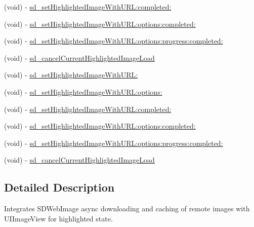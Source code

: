 \begin{DoxyCompactItemize}
\item 
(void) -\/ \mbox{\hyperlink{category_u_i_image_view_07_highlighted_web_cache_08_a25316746c184695632dd8f4b36fd219c}{sd\+\_\+set\+Highlighted\+Image\+With\+U\+R\+L\+:completed\+:}}
\item 
(void) -\/ \mbox{\hyperlink{category_u_i_image_view_07_highlighted_web_cache_08_a3bbfcd1433513161520293acac8f9fff}{sd\+\_\+set\+Highlighted\+Image\+With\+U\+R\+L\+:options\+:completed\+:}}
\item 
(void) -\/ \mbox{\hyperlink{category_u_i_image_view_07_highlighted_web_cache_08_a06bdae01c3cfc17896de4b8d3c33702d}{sd\+\_\+set\+Highlighted\+Image\+With\+U\+R\+L\+:options\+:progress\+:completed\+:}}
\item 
(void) -\/ \mbox{\hyperlink{category_u_i_image_view_07_highlighted_web_cache_08_aa7a59df2fc670e4fe5e4e7928e8e4485}{sd\+\_\+cancel\+Current\+Highlighted\+Image\+Load}}
\item 
(void) -\/ \mbox{\hyperlink{category_u_i_image_view_07_highlighted_web_cache_08_aead947977bf9f935d00079ce090a394d}{sd\+\_\+set\+Highlighted\+Image\+With\+U\+R\+L\+:}}
\item 
(void) -\/ \mbox{\hyperlink{category_u_i_image_view_07_highlighted_web_cache_08_a6280a94232644970a918aa0c0eebb008}{sd\+\_\+set\+Highlighted\+Image\+With\+U\+R\+L\+:options\+:}}
\item 
(void) -\/ \mbox{\hyperlink{category_u_i_image_view_07_highlighted_web_cache_08_a25316746c184695632dd8f4b36fd219c}{sd\+\_\+set\+Highlighted\+Image\+With\+U\+R\+L\+:completed\+:}}
\item 
(void) -\/ \mbox{\hyperlink{category_u_i_image_view_07_highlighted_web_cache_08_a3bbfcd1433513161520293acac8f9fff}{sd\+\_\+set\+Highlighted\+Image\+With\+U\+R\+L\+:options\+:completed\+:}}
\item 
(void) -\/ \mbox{\hyperlink{category_u_i_image_view_07_highlighted_web_cache_08_a06bdae01c3cfc17896de4b8d3c33702d}{sd\+\_\+set\+Highlighted\+Image\+With\+U\+R\+L\+:options\+:progress\+:completed\+:}}
\item 
(void) -\/ \mbox{\hyperlink{category_u_i_image_view_07_highlighted_web_cache_08_aa7a59df2fc670e4fe5e4e7928e8e4485}{sd\+\_\+cancel\+Current\+Highlighted\+Image\+Load}}
\end{DoxyCompactItemize}


\subsection{Detailed Description}
Integrates S\+D\+Web\+Image async downloading and caching of remote images with U\+I\+Image\+View for highlighted state. 

